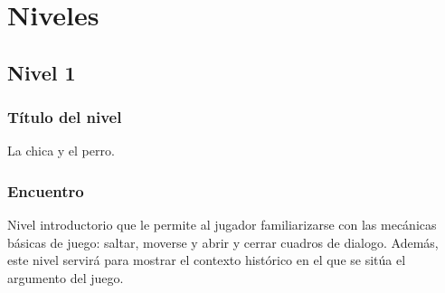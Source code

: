\documentclass[11pt,letterpaper]{article}
\begin{document}
	\section{Niveles}
\subsection{Nivel 1}
	\subsubsection{Título del nivel}
	La chica y el perro.
	\subsubsection{Encuentro}
Nivel introductorio que le permite al jugador familiarizarse con las mecánicas básicas de juego: saltar, moverse y abrir y cerrar cuadros de dialogo. Además, este nivel servirá para mostrar el contexto histórico en el que se sitúa el argumento del juego.
\end{document}
